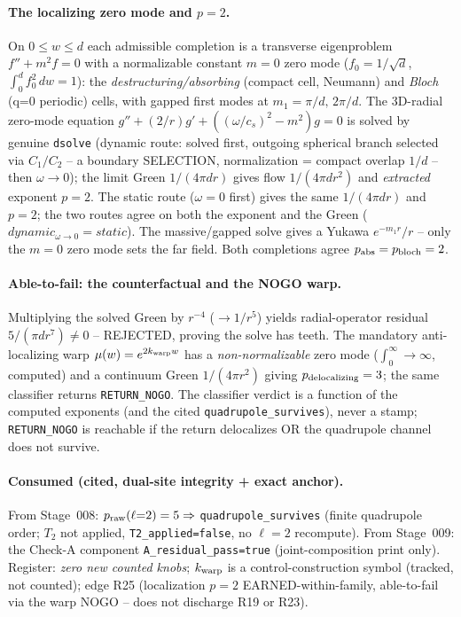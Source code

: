 \paragraph{The localizing zero mode and \texorpdfstring{\(p=2\)}{p=2}.}
On \(0\le w\le d\) each admissible completion is a transverse eigenproblem
\(f''+m^2 f=0\) with a normalizable constant \(m{=}0\) zero mode
(\(f_0=1/\sqrt{d}\), \(\int_0^d f_0^2\,dw=1\)): the
\emph{destructuring/absorbing} (compact cell, Neumann) and \emph{Bloch} (q=0
periodic) cells, with gapped first modes at \(m_1=\pi/d,\,2\pi/d\). The 3D-radial
zero-mode equation \(g''+(2/r)g'+((\omega/c_s)^2-m^2)g=0\) is solved by genuine
\texttt{dsolve} (dynamic route: solved first, outgoing spherical branch selected
via \(C_1/C_2\) -- a boundary SELECTION, normalization = compact overlap \(1/d\)
-- then \(\omega\to0\)); the limit Green \(1/(4\pi d r)\) gives flow
\(1/(4\pi d r^2)\) and \emph{extracted} exponent \(p=2\). The static route
(\(\omega=0\) first) gives the same \(1/(4\pi d r)\) and \(p=2\); the two routes
agree on both the exponent and the Green (\(dynamic_{\omega\to0}=static\)). The
massive/gapped solve gives a Yukawa \(e^{-m_1 r}/r\) -- only the \(m{=}0\) zero
mode sets the far field. Both completions agree \(p_{\rm abs}=p_{\rm bloch}=2\).

\paragraph{Able-to-fail: the counterfactual and the NOGO warp.}
Multiplying the solved Green by \(r^{-4}\) (\(\to1/r^5\)) yields radial-operator
residual \(5/(\pi d r^7)\ne0\) -- REJECTED, proving the solve has teeth. The
mandatory anti-localizing warp \(\mu(w)=e^{2k_{\rm warp}w}\) has a
\emph{non-normalizable} zero mode (\(\int_0^\infty\to\infty\), computed) and a
continuum Green \(1/(4\pi r^2)\) giving \(p_{\rm delocalizing}=3\); the same
classifier returns \texttt{RETURN\_NOGO}. The classifier verdict is a function
of the computed exponents (and the cited \texttt{quadrupole\_survives}), never a
stamp; \texttt{RETURN\_NOGO} is reachable if the return delocalizes OR the
quadrupole channel does not survive.

\paragraph{Consumed (cited, dual-site integrity + exact anchor).}
From Stage~008: \(p_{\rm raw}(\ell{=}2)=5\Rightarrow\)
\texttt{quadrupole\_survives} (finite quadrupole order; \(T_2\) not applied,
\texttt{T2\_applied=false}, no \(\ell{=}2\) recompute). From Stage~009: the
Check-A component \texttt{A\_residual\_pass=true} (joint-composition print only).
Register: \emph{zero new counted knobs}; \(k_{\rm warp}\) is a
control-construction symbol (tracked, not counted); edge R25 (localization
\(p=2\) EARNED-within-family, able-to-fail via the warp NOGO -- does not
discharge R19 or R23).

